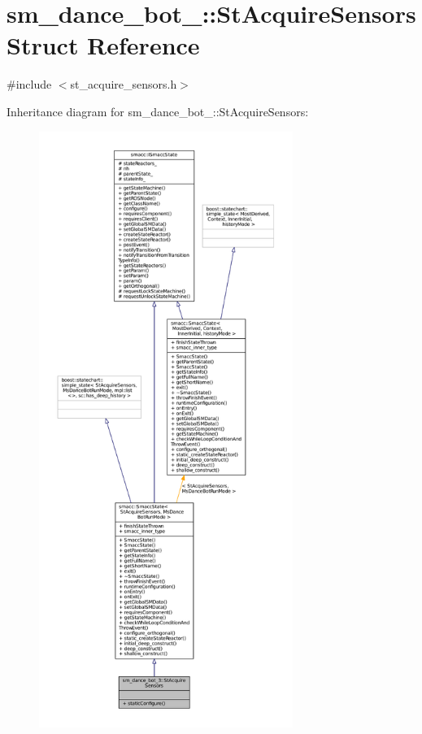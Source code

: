 \hypertarget{structsm__dance__bot__3_1_1StAcquireSensors}{}\section{sm\+\_\+dance\+\_\+bot\+\_\+:\+:St\+Acquire\+Sensors Struct Reference}
\label{structsm__dance__bot__3_1_1StAcquireSensors}


{\ttfamily \#include $<$st\+\_\+acquire\+\_\+sensors.\+h$>$}



Inheritance diagram for sm\+\_\+dance\+\_\+bot\+\_\+:\+:St\+Acquire\+Sensors\+:
\nopagebreak
\begin{figure}[H]
\begin{center}
\leavevmode
\includegraphics[height=550pt]{structsm__dance__bot__3_1_1StAcquireSensors__inherit__graph}
\end{center}
\end{figure}


